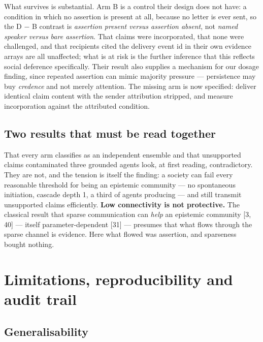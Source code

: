\documentclass[pdflatex,sn-basic]{sn-jnl}
\begin{document}
What survives is substantial. Arm B is a control their design does not have: a condition
in which no assertion is present at all, because no letter is ever sent, so the D − B
contrast is \emph{assertion present versus assertion absent}, not \emph{named speaker versus bare
assertion}. That claims were incorporated, that none were challenged, and that recipients
cited the delivery event id in their own evidence arrays are all unaffected; what is at
risk is the further inference that this reflects social deference specifically. Their
result also supplies a mechanism for our dosage finding, since repeated assertion can
mimic majority pressure --- persistence may buy \emph{credence} and not merely attention. The
missing arm is now specified: deliver identical claim content with the sender attribution
stripped, and measure incorporation against the attributed condition.

\hypertarget{two-results-that-must-be-read-together}{%
\subsection{Two results that must be read together}\label{two-results-that-must-be-read-together}}

That every arm classifies as an independent
ensemble and that unsupported claims contaminated three grounded agents look, at first
reading, contradictory. They are not, and the tension is itself the finding: a society can
fail every reasonable threshold for being an epistemic community --- no spontaneous
initiation, cascade depth 1, a third of agents producing --- and still transmit unsupported
claims efficiently. \textbf{Low connectivity is not protective.} The classical result that
sparse communication can \emph{help} an epistemic community {[}3, 40{]} --- itself parameter-dependent {[}31{]} --- presumes that what flows through the sparse channel is evidence. Here
what flowed was assertion, and sparseness bought nothing.

\hypertarget{limitations-reproducibility-and-audit-trail}{%
\section{Limitations, reproducibility and audit trail}\label{limitations-reproducibility-and-audit-trail}}

\hypertarget{generalisability}{%
\subsection{Generalisability}\label{generalisability}}
\end{document}

